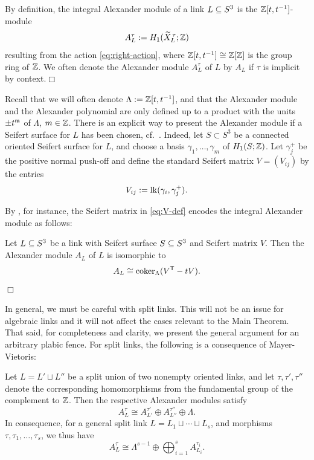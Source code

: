 \begin{definition}\label{def:alex-module}
By definition, the integral Alexander module of a link $L\subseteq S^3$ is the $\mathbb Z[t,t^{-1}]$-module 
\[
   A_L^\tau:=H_1(\widetilde X_L^{\,\tau};\mathbb Z)
\]
resulting from the action \eqref{eq:right-action}, where $\mathbb Z[t,t^{-1}]\cong\mathbb Z[\mathbb Z]$ is the group ring of $\mathbb Z$. We often denote the Alexander module $A_L^\tau$ of $L$ by $A_L$ if $\tau$ is implicit by context.\hfill$\Box$
\end{definition}

Recall that we will often denote $\Lambda:=\mathbb Z[t,t^{-1}]$, and that the Alexander module and the Alexander polynomial are only defined up to a product with the units $\pm t^\mathfrak m$ of $\Lambda$, $m\in\mathbb Z$. There is an explicit way to present the Alexander module if a Seifert surface for $L$ has been chosen, cf.~\cite[Chapter 2]{lickorish1997introduction}. Indeed, let $S\subset S^3$ be a connected oriented Seifert surface for $L$, and choose a basis $\gamma_1,\ldots,\gamma_m$ of $H_1(S;\mathbb Z)$. Let $\gamma_j^+$ be the positive normal push-off and define the standard Seifert matrix $V=(V_{ij})$ by the entries
\begin{equation}\label{eq:V-def}
   V_{ij}:=\operatorname{lk}(\gamma_i,\gamma_j^+).
\end{equation}

\noindent By \cite[Theorem 6.5]{lickorish1997introduction}, for instance, the Seifert matrix in \eqref{eq:V-def} encodes the integral Alexander module as follows:

\begin{proposition}\label{prop:seifert-presentation} Let $L\subseteq S^3$ be a link with Seifert surface $S\subseteq S^3$ and Seifert matrix $V$. Then the Alexander module $A_L$ of $L$ is isomorphic to
   $$A_L\cong\operatorname{coker}_\Lambda(V^{\mathsf T}-tV).$$
   \hfill$\Box$
\end{proposition}

In general, we must be careful with split links. This will not be an issue for algebraic links and it will not affect the cases relevant to the Main Theorem. That said, for completeness and clarity, we present the general argument for an arbitrary plabic fence. For split links, the following is a consequence of Mayer-Vietoris:

\begin{lemma}\label{lem:split-module}
Let $L=L'\sqcup L''$ be a split union of two nonempty oriented links, and let $\tau,\tau',\tau''$ denote the corresponding homomorphisms from the fundamental group of the complement to $\mathbb Z$. Then the respective Alexander modules satisfy
\begin{equation}\label{eq:split-two}
   A_L^\tau
   \cong
   A_{L'}^{\tau'}\oplus A_{L''}^{\tau''}\oplus\Lambda.
\end{equation}
In consequence, for a general split link $L=L_1\sqcup\cdots\sqcup L_s$, and morphisms $\tau,\tau_1,\ldots,\tau_s$, we thus have
\begin{equation}\label{eq:split-s}
   A_L^\tau
   \cong
   \Lambda^{s-1}\oplus
   \bigoplus_{i=1}^s A_{L_i}^{\tau_i}.
\end{equation}
\end{lemma}

